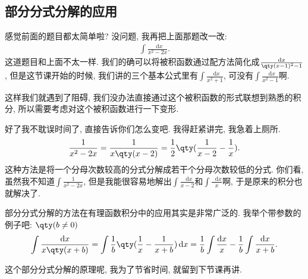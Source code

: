 \documentclass{ctexbook}
\newcommand*{\dif}{\mathop{}\!\mathrm{d}}
\begin{document}
{\subsection{部分分式分解的应用}
感觉前面的题目都太简单啦? 没问题, 我再把上面那题改一改: 
\begin{align*}
\int\frac{\dif{x}}{x^{2}-2x}
.\end{align*}
这道题目和上面不太一样. 我们的确可以将被积函数通过配方法简化成$\frac{\dif{x}}{\qty(x-1)^{2}-1}$, 但是这节课开始的时候, 我们讲的三个基本公式里有$\int\frac{\dif{x}}{x^{2}+1}$, 可没有$\int\frac{\dif{x}}{x^{2}-1}$啊. \par
这样我们就遇到了阻碍, 我们没办法直接通过这个被积函数的形式联想到熟悉的积分, 所以需要考虑对这个被积函数进行一下变形. \par
好了我不耽误时间了, 直接告诉你们怎么变吧. 我得赶紧讲完, 我急着上厕所. 
\begin{align*}
\frac{1}{x^{2}-2x}=\frac{1}{x\qty(x-2)}=\frac{1}{2}\qty(\frac{1}{x-2}-\frac{1}{x})
.\end{align*}
这种方法是将一个分母次数较高的分式分解成若干个分母次数较低的分式. 你们看, 虽然我不知道$\int\frac{1}{x^{2}-2x}$, 但是我能很容易地解出$\int\frac{\dif{x}}{x-2}$和$\int\frac{\dif{x}}{x}$啊, 于是原来的积分也就解决了. \par
部分分式分解的方法在有理函数积分中的应用其实是非常广泛的. 我举个带参数的例子吧: $\qty(b\ne0)$
\begin{align*}
\int\frac{\dif{x}}{x\qty(x+b)}=\int\frac{1}{b}\qty(\frac{1}{x}-\frac{1}{x+b})\dif{x}=\frac{1}{b}\int\frac{\dif{x}}{x}-\frac{1}{b}\int\frac{\dif{x}}{x+b}
.\end{align*}\par
这个部分分式分解的原理呢, 我为了节省时间, 就留到下节课再讲. \par
}
\end{document}
